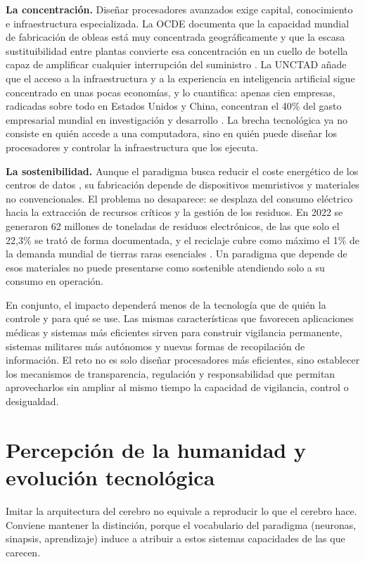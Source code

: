 \documentclass[a4paper,11pt,oneside]{book}
\begin{document}
\textbf{La concentración.} Diseñar procesadores avanzados exige capital,
conocimiento e infraestructura especializada. La OCDE documenta que la capacidad
mundial de fabricación de obleas está muy concentrada geográficamente y que la
escasa sustituibilidad entre plantas convierte esa concentración en un cuello de
botella capaz de amplificar cualquier interrupción del suministro
\parencite{oecd2025chips}. La UNCTAD añade que el acceso a la infraestructura y a
la experiencia en inteligencia artificial sigue concentrado en unas pocas
economías, y lo cuantifica: apenas cien empresas, radicadas sobre todo en Estados
Unidos y China, concentran el 40\% del gasto empresarial mundial en investigación
y desarrollo \parencite{unctad2025}. La brecha tecnológica ya no consiste en
quién accede a una computadora, sino en quién puede diseñar los procesadores y
controlar la infraestructura que los ejecuta.

\textbf{La sostenibilidad.} Aunque el paradigma busca reducir el coste
energético de los centros de datos \parencite{roy2019}, su fabricación depende de
dispositivos memristivos y materiales no convencionales. El problema no
desaparece: se desplaza del consumo eléctrico hacia la extracción de recursos
críticos y la gestión de los residuos. En 2022 se generaron 62 millones de
toneladas de residuos electrónicos, de las que solo el 22,3\% se trató de forma
documentada, y el reciclaje cubre como máximo el 1\% de la demanda mundial de
tierras raras esenciales \parencite{ewaste2024}. Un paradigma que depende de esos
materiales no puede presentarse como sostenible atendiendo solo a su consumo en
operación.

En conjunto, el impacto dependerá menos de la tecnología que de quién la
controle y para qué se use. Las mismas características que favorecen
aplicaciones médicas y sistemas más eficientes sirven para construir vigilancia
permanente, sistemas militares más autónomos y nuevas formas de recopilación de
información. El reto no es solo diseñar procesadores más eficientes, sino
establecer los mecanismos de transparencia, regulación y responsabilidad que
permitan aprovecharlos sin ampliar al mismo tiempo la capacidad de vigilancia,
control o desigualdad.

\section{Percepción de la humanidad y evolución tecnológica}

Imitar la arquitectura del cerebro no equivale a reproducir lo que el cerebro
hace. Conviene mantener la distinción, porque el vocabulario del paradigma
(neuronas, sinapsis, aprendizaje) induce a atribuir a estos sistemas capacidades
de las que carecen.
\end{document}

